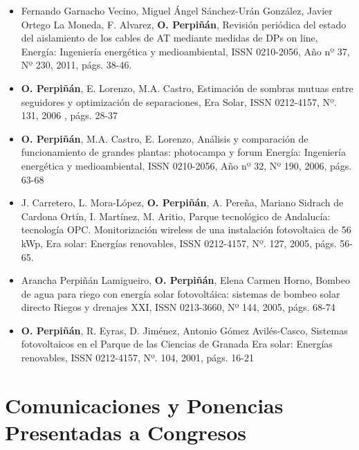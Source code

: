 \documentclass[article, a4paper]{memoir}
\begin{document}
\begin{itemize}
\item Fernando Garnacho Vecino, Miguel Ángel Sánchez-Urán González, Javier
Ortego La Moneda, F. Alvarez, \textbf{O. Perpiñán},
Revisión periódica del estado del aislamiento de los cables de
AT mediante medidas de DPs on line, Energía: Ingeniería
energética y medioambiental, ISSN 0210-2056, Año nº 37, Nº
230, 2011, págs. 38-46.

\item \textbf{O. Perpiñán}, E. Lorenzo, M.A. Castro, Estimación de sombras mutuas
entre seguidores y optimización de separaciones, Era Solar, ISSN
0212-4157, Nº. 131, 2006 , págs. 28-37

\item \textbf{O. Perpiñán}, M.A. Castro, E. Lorenzo, Análisis y
comparación de funcionamiento de grandes plantas: photocampa y forum
Energía: Ingeniería energética y medioambiental, ISSN 0210-2056, Año
nº 32, Nº 190, 2006, págs. 63-68

\item J. Carretero, L. Mora-López, \textbf{O. Perpiñán}, A. Pereña, Mariano Sidrach
de Cardona Ortín, I. Martínez, M. Aritio, Parque tecnológico de
Andalucía: tecnología OPC. Monitorización wireless de una
instalación fotovoltaica de 56 kWp, Era solar: Energías renovables,
ISSN 0212-4157, Nº. 127, 2005, págs. 56-65.

\item Arancha Perpiñán Lamigueiro, \textbf{O. Perpiñán}, Elena Carmen
Horno, Bombeo de agua para riego con energía solar fotovoltáica:
sistemas de bombeo solar directo Riegos y drenajes XXI, ISSN
0213-3660, Nº 144, 2005, págs. 68-74

\item \textbf{O. Perpiñán}, R. Eyras, D. Jiménez, Antonio Gómez
Avilés-Casco, Sistemas fotovoltaicos en el Parque de las
Ciencias de Granada Era solar: Energías renovables, ISSN
0212-4157, Nº. 104, 2001, págs. 16-21
\end{itemize}


\section{Comunicaciones y Ponencias Presentadas a Congresos}
\label{sec-6}
\end{document}

